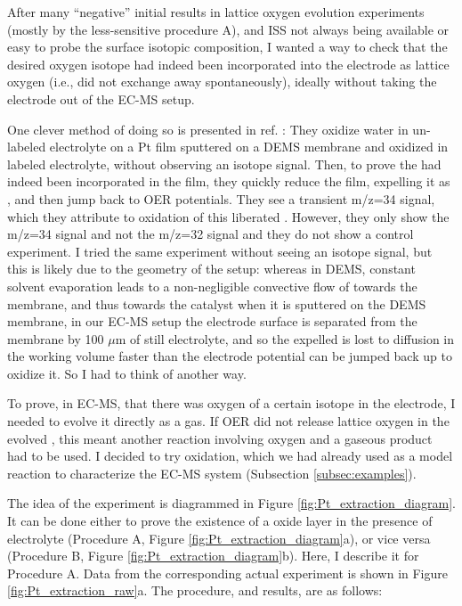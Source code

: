 After many ``negative'' initial results in lattice oxygen evolution experiments (mostly by the less-sensitive procedure A), and ISS not always being available or easy to probe the surface isotopic composition, I wanted a way to check that the desired oxygen isotope had indeed been incorporated into the electrode as lattice oxygen (i.e., did not exchange away spontaneously), ideally without taking the electrode out of the EC-MS setup. 

One clever method of doing so is presented in ref. : They oxidize water in un-labeled electrolyte on a Pt film sputtered on a DEMS membrane and oxidized in labeled electrolyte, without observing an isotope signal. Then, to prove the  had indeed been incorporated in the film, they quickly reduce the film, expelling it as , and then jump back to OER potentials. They see a transient m/z=34 signal, which they attribute to oxidation of this liberated . However, they only show the m/z=34 signal and not the m/z=32 signal and they do not show a control experiment. I tried the same experiment without seeing an isotope signal, but this is likely due to the geometry of the setup: whereas in DEMS, constant solvent evaporation leads to a non-negligible convective flow of  towards the membrane, and thus towards the catalyst when it is sputtered on the DEMS membrane, in our EC-MS setup the electrode surface is separated from the membrane by 100 $\mu$m of still electrolyte, and so the expelled  is lost to diffusion in the working volume faster than the electrode potential can be jumped back up to oxidize it. So I had to think of another way.

To prove, in EC-MS, that there was oxygen of a certain isotope in the electrode, I needed to evolve it directly as a gas. If OER did not release lattice oxygen in the evolved , this meant another reaction involving oxygen and a gaseous product had to be used. I decided to try  oxidation, which we had already used as a model reaction to characterize the EC-MS system (Subsection \ref{subsec:examples}). 

The idea of the experiment is diagrammed in Figure \ref{fig:Pt_extraction_diagram}. It can be done either to prove the existence of a  oxide layer in the presence of  electrolyte (Procedure A, Figure \ref{fig:Pt_extraction_diagram}a), or vice versa (Procedure B, Figure \ref{fig:Pt_extraction_diagram}b). Here, I describe it for Procedure A. Data from the corresponding actual experiment is shown in Figure \ref{fig:Pt_extraction_raw}a. The procedure, and results, are as follows:


